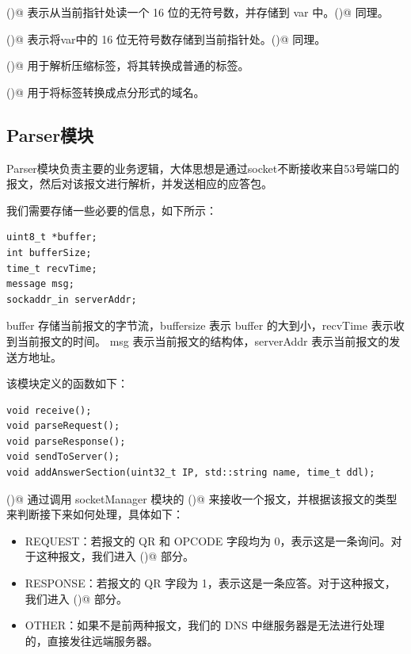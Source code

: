 \documentclass[]{article}
\begin{document}
        ()@ 表示从当前指针处读一个 16 位的无符号数，并存储到 var 中。()@ 同理。
        
        ()@ 表示将var中的 16 位无符号数存储到当前指针处。()@ 同理。
        
        \verb@unpackName()@ 用于解析压缩标签，将其转换成普通的标签。

        \verb@transName()@ 用于将标签转换成点分形式的域名。

    \subsection{Parser模块}
        Parser模块负责主要的业务逻辑，大体思想是通过socket不断接收来自53号端口的报文，然后对该报文进行解析，并发送相应的应答包。

        我们需要存储一些必要的信息，如下所示：

        \begin{lstlisting}
uint8_t *buffer;
int bufferSize;
time_t recvTime;
message msg;
sockaddr_in serverAddr;
        \end{lstlisting}

        buffer 存储当前报文的字节流，buffersize 表示 buffer 的大到小，recvTime 表示收到当前报文的时间。
        msg 表示当前报文的结构体，serverAddr 表示当前报文的发送方地址。

        该模块定义的函数如下：
        
        \begin{lstlisting}
void receive();
void parseRequest();
void parseResponse();
void sendToServer();
void addAnswerSection(uint32_t IP, std::string name, time_t ddl);
        \end{lstlisting}

        \verb@receive()@ 通过调用 socketManager 模块的 \verb@recvBuffer()@ 来接收一个报文，并根据该报文的类型来判断接下来如何处理，具体如下：
        
        \begin{itemize}
            \item REQUEST：若报文的 QR 和 OPCODE 字段均为 0，表示这是一条询问。对于这种报文，我们进入 \verb@parseRequest()@ 部分。
            \item RESPONSE：若报文的 QR 字段为 1，表示这是一条应答。对于这种报文，我们进入 \verb@parseResponse()@ 部分。
            \item OTHER：如果不是前两种报文，我们的 DNS 中继服务器是无法进行处理的，直接发往远端服务器。
        \end{itemize}
\end{document}
